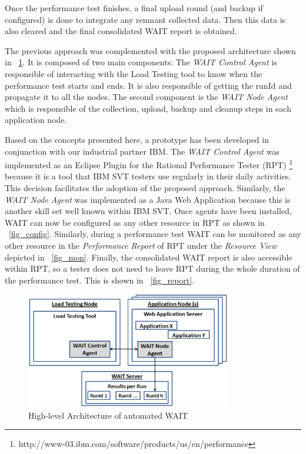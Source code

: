 \documentclass[runningheads,a4paper]{llncs}
\begin{document}
Once the performance test finishes, a final upload round (and backup if
configured) is done to integrate any remnant collected data. Then this data is
also cleared and the final consolidated WAIT report is obtained.

The previous approach was complemented with the proposed architecture shown in
\figurename ~\ref{fig_Arch}. It is composed of two main components: The
\emph{WAIT Control Agent} is responsible of interacting with the Load Testing
tool to know when the performance test starts and ends. It is also responsible
of getting the runId and propagate it to all the nodes. The second component is
the \emph{WAIT Node Agent} which is responsible of the collection, upload,
backup and cleanup steps in each application node.

Based on the concepts presented here, a prototype has been developed in
conjunction with our industrial partner IBM. The \emph{WAIT Control Agent} was
implemented as an Eclipse Plugin for the Rational Performance Tester (RPT)
\footnote{http://www-03.ibm.com/software/products/us/en/performance} because
it is a tool that IBM SVT testers use regularly in their daily
activities. This decision facilitates the adoption of the proposed approach.
Similarly, the \emph{WAIT Node Agent} was implemented as a Java Web Application because this is
another skill set well known within IBM SVT. Once agents have been installed,
WAIT can now be configured as any other resource in RPT as shown in \figurename ~\ref{fig_config}. Similarly, during a performance
test WAIT can be monitored as any other resource in the \emph{Performance
Report} of RPT under the \emph{Resource View} depicted in \figurename ~\ref{fig_mon}. 
Finally, the consolidated WAIT report is also accessible within RPT, so a tester
does not need to leave RPT during the whole duration of the performance test. This is
shown in \figurename ~\ref{fig_report}.

\vspace{-5pt}
\begin{figure}[!h]
\centering
\includegraphics[totalheight=.22\textheight,width=0.8\textwidth]{architecture_dwait}
\caption{High-level Architecture of automated WAIT}
\label{fig_Arch}
\end{figure}
\vspace{-5pt}
\end{document}
